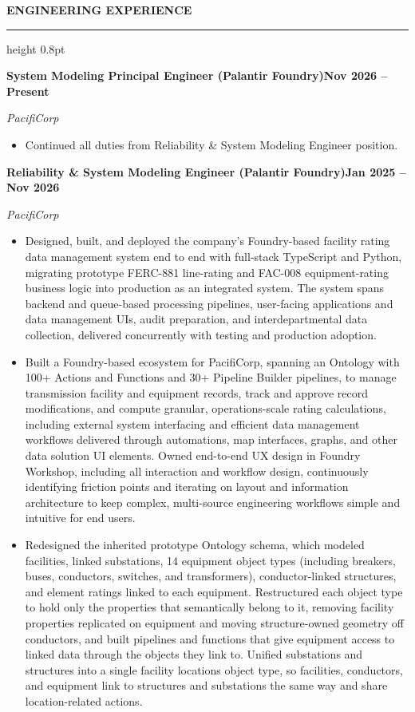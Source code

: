 \documentclass[10pt, letterpaper]{article}
\newcommand{\rsection}[1]{%
  \vspace{10pt}%
  {\large\bfseries\MakeUppercase{#1}}%
  \vspace{1pt}%
  \hrule height 0.8pt%
  \vspace{5pt}%
}
\newcommand{\jobline}[2]{%
  \vspace{5pt}%
  \noindent\textbf{#1}\hfill\textbf{#2}\par%
  \vspace{1pt}%
}
\newcommand{\subline}[1]{%
  \vspace{-1pt}%
  \noindent\textit{#1}\par%
  \vspace{1pt}%
}
\newenvironment{rlist}{%
  \begin{itemize}[leftmargin=1.4em, itemsep=1pt, topsep=2pt, parsep=0pt]%
}{%
  \end{itemize}%
}
\begin{document}
\rsection{Engineering Experience}

\jobline{System Modeling Principal Engineer (Palantir Foundry)}{Nov 2026 -- Present}
\subline{PacifiCorp}
\begin{rlist}
  \item Continued all duties from Reliability \& System Modeling Engineer position.
\end{rlist}

\jobline{Reliability \& System Modeling Engineer (Palantir Foundry)}{Jan 2025 -- Nov 2026}
\subline{PacifiCorp}
\begin{rlist} 
  \item Designed, built, and deployed the company's Foundry-based facility rating data management system end to end with full-stack TypeScript and Python, migrating prototype FERC-881 line-rating and FAC-008 equipment-rating business logic into production as an integrated system. The system spans backend and queue-based processing pipelines, user-facing applications and data management UIs, audit preparation, and interdepartmental data collection, delivered concurrently with testing and production adoption.
  \item Built a Foundry-based ecosystem for PacifiCorp, spanning an Ontology with 100+ Actions and Functions and 30+ Pipeline Builder pipelines, to manage transmission facility and equipment records, track and approve record modifications, and compute granular, operations-scale rating calculations, including external system interfacing and efficient data management workflows delivered through automations, map interfaces, graphs, and other data solution UI elements. Owned end-to-end UX design in Foundry Workshop, including all interaction and workflow design, continuously identifying friction points and iterating on layout and information architecture to keep complex, multi-source engineering workflows simple and intuitive for end users.
  \item Redesigned the inherited prototype Ontology schema, which modeled facilities, linked substations, 14 equipment object types (including breakers, buses, conductors, switches, and transformers), conductor-linked structures, and element ratings linked to each equipment. Restructured each object type to hold only the properties that semantically belong to it, removing facility properties replicated on equipment and moving structure-owned geometry off conductors, and built pipelines and functions that give equipment access to linked data through the objects they link to. Unified substations and structures into a single facility locations object type, so facilities, conductors, and equipment link to structures and substations the same way and share location-related actions.

\end{rlist}
\end{document}
